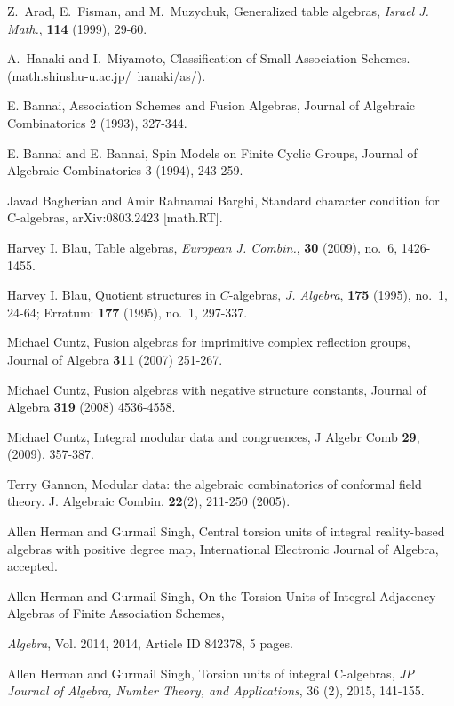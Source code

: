 \documentclass[12pt]{amsart}
\begin{document}
\begin{thebibliography}{10}

 Z.~Arad, E.~Fisman, and M.~Muzychuk, Generalized table algebras, {\it Israel J. Math.}, {\bf 114} (1999), 29-60.

 A.~Hanaki and I.~Miyamoto, Classification of Small Association Schemes. (math.shinshu-u.ac.jp/~hanaki/as/).

  E. Bannai, Association Schemes and Fusion Algebras, Journal of Algebraic Combinatorics 2 (1993), 327-344.

  E. Bannai and E. Bannai, Spin Models on Finite Cyclic Groups, Journal of Algebraic Combinatorics 3 (1994), 243-259.

 Javad Bagherian and Amir Rahnamai Barghi, Standard character condition for C-algebras, arXiv:0803.2423 [math.RT].

 Harvey I. Blau, Table algebras, {\it European J. Combin.}, {\bf 30} (2009), no.~6, 1426-1455.

 Harvey I. Blau, Quotient structures in $C$-algebras, {\it J. Algebra}, {\bf 175} (1995), no.~1, 24-64; Erratum: {\bf 177} (1995), no.~1, 297-337.

 Michael Cuntz, Fusion algebras for imprimitive complex
reflection groups, Journal of Algebra {\bf 311} (2007) 251-267.

 Michael Cuntz, Fusion algebras with negative structure constants, Journal of Algebra {\bf 319} (2008) 4536-4558.

 Michael Cuntz, Integral modular data and congruences, J Algebr Comb {\bf29}, (2009), 357-387.

 Terry Gannon, Modular data: the algebraic combinatorics of conformal field theory. J. Algebraic Combin. \textbf{22}(2), 211-250 (2005).

 Allen Herman and Gurmail Singh, Central torsion units of integral reality-based algebras with positive degree map, International Electronic Journal of Algebra, accepted.

 Allen Herman and Gurmail Singh, On the Torsion Units of Integral Adjacency Algebras of Finite Association Schemes, {{\it Algebra}, Vol. 2014, 2014, Article ID 842378, 5 pages.

 Allen Herman and Gurmail Singh, Torsion units of integral C-algebras, {\it JP Journal of Algebra, Number Theory, and Applications}, 36 (2), 2015, 141-155.

}
\end{thebibliography}
\end{document}
